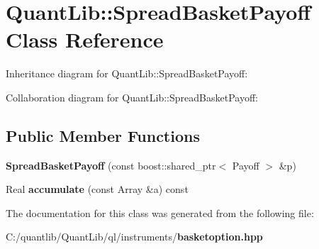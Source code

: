 \section{Quant\+Lib\+:\+:Spread\+Basket\+Payoff Class Reference}
\label{class_quant_lib_1_1_spread_basket_payoff}


Inheritance diagram for Quant\+Lib\+:\+:Spread\+Basket\+Payoff\+:


Collaboration diagram for Quant\+Lib\+:\+:Spread\+Basket\+Payoff\+:
\subsection*{Public Member Functions}
\begin{DoxyCompactItemize}
\item 
{\bfseries Spread\+Basket\+Payoff} (const boost\+::shared\+\_\+ptr$<$ Payoff $>$ \&p)\label{class_quant_lib_1_1_spread_basket_payoff_a1751295f4d73878f7a4c0a0495b2d787}

\item 
Real {\bfseries accumulate} (const Array \&a) const \label{class_quant_lib_1_1_spread_basket_payoff_a4666844019366a6cdd5b17ee046bea69}

\end{DoxyCompactItemize}


The documentation for this class was generated from the following file\+:\begin{DoxyCompactItemize}
\item 
C\+:/quantlib/\+Quant\+Lib/ql/instruments/{\bf basketoption.\+hpp}\end{DoxyCompactItemize}
